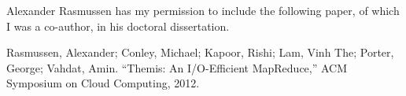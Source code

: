 Alexander Rasmussen has my permission to include the following paper, of which
I was a co-author, in his doctoral dissertation.

Rasmussen, Alexander; Conley, Michael; Kapoor, Rishi; Lam, Vinh The; Porter,
George; Vahdat, Amin. ``Themis: An I/O-Efficient MapReduce,'' ACM Symposium on
Cloud Computing, 2012.
